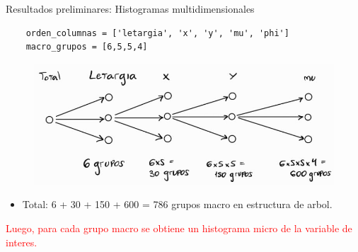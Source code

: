 \documentclass[aspectratio=169,english]{beamer}
\begin{document}
\begin{frame}[fragile]{Resultados preliminares: Histogramas multidimensionales}

    \begin{verbatim}
    orden_columnas = ['letargia', 'x', 'y', 'mu', 'phi']
    macro_grupos = [6,5,5,4]
    \end{verbatim}

    \begin{figure}
        \centering
        \includegraphics[width=0.7\linewidth]{imagens/esquema3.jpeg}
        \label{fig:esquema31}
    \end{figure}

    \begin{itemize}
        \item Total: 6 + 30 + 150 + 600 = 786 grupos macro en estructura de arbol.
    \end{itemize}
    \textcolor{red}{Luego, para cada grupo macro se obtiene un histograma micro de la variable de interes.}

\end{frame}
\end{document}
